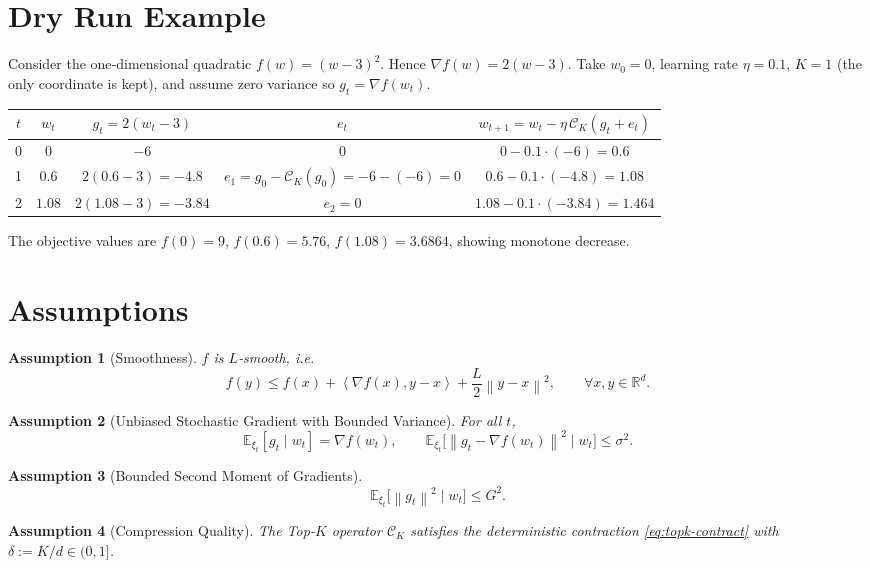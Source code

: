 \documentclass{article}
\newtheorem{assumption}{Assumption}
\newcommand{\E}{\mathbb{E}}
\newcommand{\norm}[1]{\left\lVert #1\right\rVert}
\newcommand{\ip}[2]{\left\langle #1,#2\right\rangle}
\newcommand{\cK}{\mathcal{C}_K}
\begin{document}
\section*{Dry Run Example}
Consider the one‑dimensional quadratic $f(w)=(w-3)^2$.
Hence $\nabla f(w)=2(w-3)$.  
Take $w_0=0$, learning rate $\eta=0.1$, $K=1$ (the only coordinate is kept), and assume zero variance so $g_t=\nabla f(w_t)$.

\begin{center}
\begin{tabular}{c|c|c|c|c}
$t$ & $w_t$ & $g_t=2(w_t-3)$ & $e_t$ & $w_{t+1}=w_t-\eta\,\cK(g_t+e_t)$ \\ \hline
0 & $0$   & $-6$ & $0$ & $0-0.1\cdot(-6)=0.6$ \\
1 & $0.6$ & $2(0.6-3)=-4.8$ & $e_1=g_0-\cK(g_0) = -6-(-6)=0$ & $0.6-0.1\cdot(-4.8)=1.08$ \\
2 & $1.08$& $2(1.08-3)=-3.84$ & $e_2=0$ & $1.08-0.1\cdot(-3.84)=1.464$ \\
\end{tabular}
\end{center}
The objective values are $f(0)=9$, $f(0.6)=5.76$, $f(1.08)=3.6864$, showing monotone decrease.

\newpage
\section*{Assumptions}
\begin{assumption}[Smoothness]
\label{as:smooth}
$f$ is $L$‑smooth, i.e.
\[
f(y)\le f(x)+\ip{\nabla f(x)}{y-x}+\frac{L}{2}\norm{y-x}^2,\qquad\forall x,y\in\mathbb{R}^d .
\]
\end{assumption}

\begin{assumption}[Unbiased Stochastic Gradient with Bounded Variance]
\label{as:unbiased}
For all $t$,
\[
\E_{\xi_t}[g_t\mid w_t]=\nabla f(w_t),\qquad
\E_{\xi_t}\!\bigl[\norm{g_t-\nabla f(w_t)}^2\mid w_t\bigr]\le\sigma^2 .
\]
\end{assumption}

\begin{assumption}[Bounded Second Moment of Gradients]
\label{as:gradbound}
\[
\E_{\xi_t}\!\bigl[\norm{g_t}^2\mid w_t\bigr]\le G^2 .
\]
\end{assumption}

\begin{assumption}[Compression Quality]
\label{as:compress}
The Top‑$K$ operator $\cK$ satisfies the deterministic contraction \eqref{eq:topk-contract} with
$\delta:=K/d\in(0,1]$.
\end{assumption}
\end{document}
